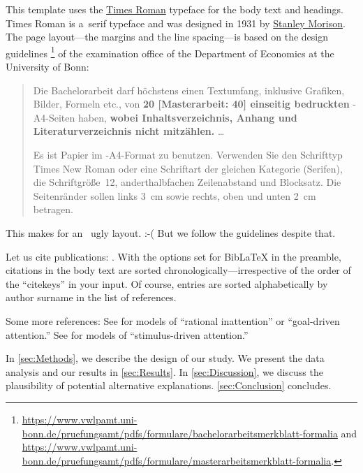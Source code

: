 This template uses the \href{https://en.wikipedia.org/wiki/Times_New_Roman}{Times Roman} typeface for the body text and headings.%
Times Roman is a~serif type\-face and was designed in 1931 by \href{https://en.wikipedia.org/wiki/Stanley_Morison}{Stanley Morison}. The page layout---the margins and the line spacing---is based on the design guidelines%
\footnote{\url{https://www.vwlpamt.uni-bonn.de/pruefungsamt/pdfs/formulare/bachelorarbeitsmerkblatt-formalia} and \url{https://www.vwlpamt.uni-bonn.de/pruefungsamt/pdfs/formulare/masterarbeitsmerkblatt-formalia}.}
of the examination office of the Department of Economics at the University of Bonn:
\begin{quotation}
	Die Bachelorarbeit darf höchstens einen Textumfang, inklusive Grafiken, Bilder, Formeln etc., von \textbf{20 [Masterarbeit: 40] einseitig bedruckten} -A4-Seiten haben, \textbf{wobei Inhalts\-verzeichnis, Anhang und Literaturverzeichnis nicht mitzählen.} \dots
	
	Es ist Papier im -A4-Format zu benutzen. Verwenden Sie den Schrifttyp \mbox{Times} New Roman oder eine Schriftart der gleichen Kategorie (Serifen), die Schriftgröße~12, anderthalbfachen Zeilenabstand und Blocksatz. Die Seitenränder sollen links 3~cm sowie rechts, oben und unten 2~cm betragen.
\end{quotation}

This makes for an~ ugly layout. :-( But we follow the guidelines despite that. \blindtext

Let us cite  publications: \cite{Andersen2008, Andreoni2012, Balakrishnan2016, Koszegi2013}. With the options set for BibLaTeX in the preamble, citations in the body text are  sorted chronologically---irrespective of the order of the ``citekeys'' in your input. Of course, entries are sorted alphabetically by author surname in the list of references.

\Blindtext[2]

Some more references: See \cite{Sims2003, Gabaix2014} for models of ``rational inattention'' or ``goal-driven attention.'' See \cite{Bordalo2012, Bordalo2013, Koszegi2013, Taubinsky2014, Bushong2016} for models of ``stimulus-driven attention.''

\blindmathtrue

\blindtext

In \autoref{sec:Methods}, we describe the design of our study. We present the data analysis and our results in \autoref{sec:Results}. In \autoref{sec:Discussion}, we discuss the plausibility of potential alternative explanations. \autoref{sec:Conclusion} concludes.

